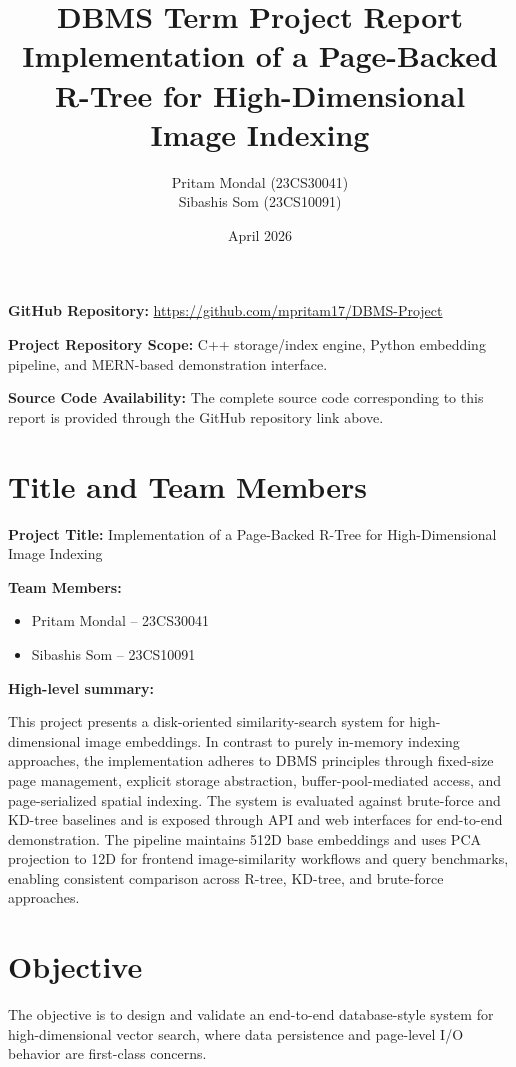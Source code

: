 \documentclass[11pt,a4paper]{article}
\title{\textbf{DBMS Term Project Report}\\[0.3em]
Implementation of a Page-Backed R-Tree for High-Dimensional Image Indexing}
\author{
Pritam Mondal (23CS30041) \\
Sibashis Som (23CS10091)
}
\date{April 2026}
\begin{document}
\maketitle
\thispagestyle{empty}

\vspace{1em}
\textbf{GitHub Repository:} \url{https://github.com/mpritam17/DBMS-Project}

\textbf{Project Repository Scope:} C++ storage/index engine, Python embedding pipeline, and MERN-based demonstration interface.

\textbf{Source Code Availability:} The complete source code corresponding to this report is provided through the GitHub repository link above.

\tableofcontents
\newpage

\section{Title and Team Members}

\textbf{Project Title:} Implementation of a Page-Backed R-Tree for High-Dimensional Image Indexing

\textbf{Team Members:}
\begin{itemize}[leftmargin=1.5em]
  \item Pritam Mondal -- 23CS30041
  \item Sibashis Som -- 23CS10091
\end{itemize}

\textbf{High-level summary:}

This project presents a disk-oriented similarity-search system for high-dimensional image embeddings. In contrast to purely in-memory indexing approaches, the implementation adheres to DBMS principles through fixed-size page management, explicit storage abstraction, buffer-pool-mediated access, and page-serialized spatial indexing. The system is evaluated against brute-force and KD-tree baselines and is exposed through API and web interfaces for end-to-end demonstration. The pipeline maintains 512D base embeddings and uses PCA projection to 12D for frontend image-similarity workflows and query benchmarks, enabling consistent comparison across R-tree, KD-tree, and brute-force approaches.

\section{Objective}

The objective is to design and validate an end-to-end database-style system for high-dimensional vector search, where data persistence and page-level I/O behavior are first-class concerns.
\end{document}
